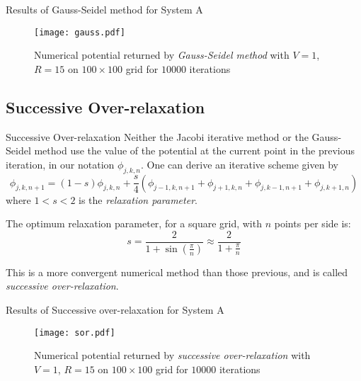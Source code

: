 \documentclass{beamer}
\newcommand{\be}{\begin{equation}}
\newcommand{\ee}{\end{equation}}
\begin{document}
\begin{frame}{Results of Gauss-Seidel method for System A}
\begin{figure}
\begin{center}
\texttt{[image: gauss.pdf]}
\caption{Numerical potential returned by \emph{Gauss-Seidel method} with $V=1$, $R=15$ on
$100\times100$ grid for $10000$ iterations}
\label{fig:gauss}
\end{center}
\end{figure}

\end{frame}

\subsection{Successive Over-relaxation}
\begin{frame}{Successive Over-relaxation}
Neither the Jacobi iterative method or the Gauss-Seidel method use the value
of the potential at the current point in the previous iteration, in our notation
$\phi_{j,k,n}$.
One can derive an iterative scheme given by
%
\be
\phi_{j,k,n+1}= (1-s)\phi_{j,k,n}+\frac{s}{4}(\phi_{j-1,k,n+1}+\phi_{j+1,k,n}+\phi_{j,k-1,n+1}+\phi_{j,k+1,n})
\ee
%
where $1<s<2$ is the \emph{relaxation parameter}.

The optimum relaxation parameter, for a square grid, with $n$ points per side is:
\be
s = \frac{2}{1+\sin(\frac{\pi}{n})} \approx \frac{2}{1+\frac{\pi}{n}}
\ee

This is a more convergent numerical method than those previous, and is called 
\emph{successive over-relaxation}.
\end{frame}

\begin{frame}{Results of Successive over-relaxation for System A}
\begin{figure}
\begin{center}
\texttt{[image: sor.pdf]}
\caption{Numerical potential returned by \emph{successive over-relaxation} with $V=1$,
$R=15$ on $100\times100$ grid for $10000$ iterations}
\label{fig:numerical}
\end{center}
\end{figure}

\end{frame}
\end{document}
